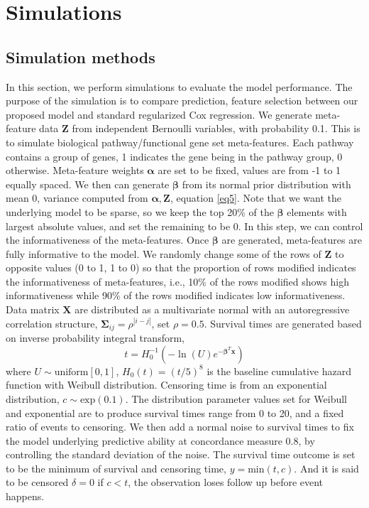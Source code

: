 \section{Simulations}
\subsection{Simulation methods}
In this section, we perform simulations to evaluate the model performance. The purpose of the simulation is to compare prediction, feature selection between our proposed model and standard regularized Cox regression. We generate meta-feature data $\bm{Z}$ from independent Bernoulli variables, with probability 0.1. This is to simulate biological pathway/functional gene set meta-features. Each pathway contains a group of genes, 1 indicates the gene being in the pathway group, 0 otherwise. Meta-feature weights $\bm{\alpha}$ are set to be fixed, values are from -1 to 1 equally spaced. We then can generate $\bm{\beta}$ from its normal prior distribution with mean 0, variance computed from $\bm{\alpha, Z}$, equation \eqref{eq5}. Note that we want the underlying model to be sparse, so we keep the top 20\% of the $\bm{\beta}$ elements with largest absolute values, and set the remaining to be 0. In this step, we can control the informativeness of the meta-features. Once $\bm{\beta}$ are generated, meta-features are fully informative to the model. We randomly change some of the rows of $\bm{Z}$ to opposite values (0 to 1, 1 to 0) so that the proportion of rows modified indicates the informativeness of meta-features, i.e., 10\% of the rows modified shows high informativeness while 90\% of the rows modified indicates low informativeness. Data matrix $\bm{X}$ are distributed as a multivariate normal with an autoregressive correlation structure, $\bm{\Sigma}_{ij} = \rho^{|i-j|}$, set $\rho=0.5$. Survival times are generated based on inverse probability integral transform,   
\begin{displaymath}
t = H_0^{-1}\left(-\ln(U)e^{-\bm{\beta}^T\bm{x}}\right)
\end{displaymath}
where $U\sim \text{uniform}[0,1]$, $H_0(t) = (t/5)^8$ is the baseline cumulative hazard function with Weibull distribution. Censoring time is from an exponential distribution, $c\sim \text{exp}(0.1)$. The distribution parameter values set for Weibull and exponential are to produce survival times range from 0 to 20, and a fixed ratio of events to censoring. We then add a normal noise to survival times to fix the model underlying predictive ability at concordance measure \citep{harrell1982evaluating} 0.8, by controlling the standard deviation of the noise. The survival time outcome is set to be the minimum of survival and censoring time, $y=\text{min}(t,c)$. And it is said to be censored $\delta=0$ if $c<t$, the observation loses follow up before event happens. 

